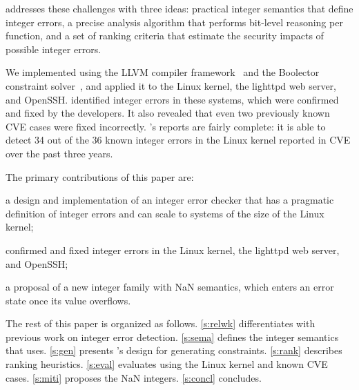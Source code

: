 \sys addresses these challenges with three ideas: practical integer
semantics that define integer errors, a precise analysis algorithm
that performs bit-level reasoning per function, and a set of ranking
criteria that estimate the security impacts of possible integer
errors.

We implemented \sys using the LLVM compiler framework~\cite{lattner:llvm}
and the Boolector constraint solver~\cite{boolector}, and applied it
to the Linux kernel, the lighttpd web server, and OpenSSH.  \sys
identified \nrbugs integer errors in these systems, which were
confirmed and fixed by the developers.  It also revealed that even
two previously known CVE cases were fixed incorrectly.
\sys's reports are fairly complete: it is able to detect 34 out of the
36 known integer errors in the Linux kernel reported in CVE over the past
three years.

%

The primary contributions of this paper are:
\begin{CompactItemize}
\item a design and implementation of an integer error checker that has a 
  pragmatic definition of integer errors and can scale to systems of the 
  size of the Linux kernel;
\item \nrbugs confirmed and fixed integer errors in
  the Linux kernel, the lighttpd web server, and OpenSSH;
\item a proposal of a new integer family with NaN semantics, which
  enters an error state once its value overflows. 
\end{CompactItemize}

The rest of this paper is organized as follows.
\autoref{s:relwk} differentiates \sys with previous work on integer 
error detection. \autoref{s:sema}
defines the integer semantics that \sys uses.  \autoref{s:gen}
presents \sys's design for generating constraints.  \autoref{s:rank}
describes ranking heuristics.  \autoref{s:eval} evaluates \sys using
the Linux kernel and known CVE cases.
\autoref{s:miti} proposes the NaN integers.
\autoref{s:concl} concludes.
